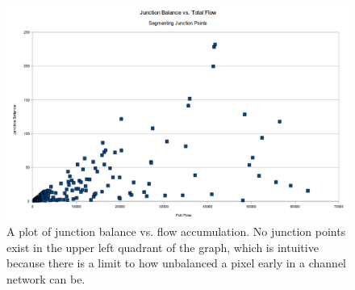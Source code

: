 \begin{figure}[t]
\begin{minipage}[b]{0.9\linewidth}
\begin{center}
\includegraphics[width=\linewidth]{images/JunctionBalanceVsFullFlow.png}
\end{center}
\end{minipage}
\caption[A plot of junction balance vs. flow accumulation]{\label{figure:BalanceVsFlow}A plot of junction balance vs. flow accumulation. No junction points exist in the upper left quadrant of the graph, which is intuitive because there is a limit to how unbalanced a pixel early in a channel network can be.}
\end{figure}
% 



